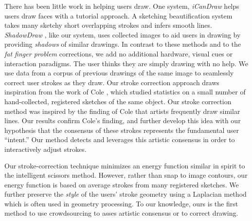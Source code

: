 There has been little work in helping users draw. One system, \emph{iCanDraw}\cite{Dixon:2010:IUS} helps users draw faces with a tutorial approach. A sketching beautification system~\cite{Orbay2011} takes many sketchy short overlapping strokes and infers smooth lines. \emph{ShadowDraw} \cite{Lee:2011}, like our system, uses collected images to aid users in drawing by providing {\em shadows} of similar drawings.  In contrast to these methods and to the \emph{fat finger problem} corrections, we add no additional hardware, visual cues or interaction paradigms. The user thinks they are simply drawing with no help. We use data from a corpus of previous drawings of the same image to seamlessly correct user strokes as they draw. Our stroke correction approach draws inspiration from the work of Cole \etal , which studied statistics on a small number of hand-collected, registered sketches of the same object. Our stroke correction method was inspired by the finding of Cole \etal {} that artists frequently draw similar lines. Our results confirm Cole's finding, and further develop this idea with our hypothesis that the consensus of these strokes represents the fundamental user ``intent.'' Our method detects and leverages this artistic consensus in order to
interactively adjust strokes.

Our stroke-correction technique minimizes an energy function similar
in spirit to the intelligent scissors
method\cite{Mortensen:1995:ISF}. However, rather than snap to image
contours, our energy function is based on average strokes from many
registered sketches. We further preserve the {\em style} of the
users' stroke geometry using a Laplacian method which is often used
in geometry processing\cite{Sorkine:2004:LSE}. To our knowledge,
ours is the first method to use crowdsourcing to asses artistic
consensus or to correct drawing.
